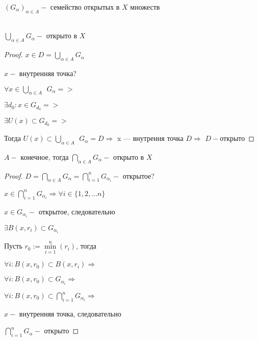     $(G_{\alpha})_{\alpha \in A}-$ семейство открытых в $X$ множеств\\\\
    \begin{theorem}
        $\bigcup\limits_{\alpha \in A} G_{\alpha}-$ открыто в $X$
    \end{theorem}
    \begin{proof}
        $x \in D = \bigcup\limits_{\alpha \in A} G_{\alpha}$
        
        $x - $ внутренняя точка?
        
        $\displaystyle \forall x \in \bigcup_{\alpha \in A} \ \ G_{\alpha} =>$
        
        $\exists d_{0} : x \in G_{d_{0}}=>$
        
        $\exists U(x) \subset G_{d_{0}}=>$
        
        Тогда $U(x) \subset \bigcup\limits_{\alpha \in A} \ \ G_{\alpha} = D \Rightarrow$ x --- внутрення точка $D \Rightarrow$ $D - $открыто
    \end{proof}
    \begin{theorem}
        $A - $ конечное, тогда $\bigcap\limits_{\alpha \in A} G_{\alpha}-$ открыто в $X$
    \end{theorem}
    \begin{proof}
        $D = \bigcap\limits_{\alpha \in A}G_{\alpha} = \bigcap\limits_{i = 1}^{n}G_{\alpha_i}-$ открытое?
        
        $x \in \bigcap\limits_{i = 1}^{n}G_{\alpha_i} \Rightarrow \forall i \in  \{1, 2, ... n\}$
        
        $x \in G_{\alpha_i}-$ открытое, следовательно
        
        $\exists B(x, r_{i}) \subset G_{\alpha_{i}}$
        
        Пусть $r_0 := \min\limits_{i = 1} ^ {n}(r_{i})$, тогда
        
        $\forall i : B(x, r_0) \subset  B(x, r_{i}) \Rightarrow$
        
        $\forall i : B(x, r_0) \subset  G_{\alpha_{i}} \Rightarrow$
        
        $\forall i : B(x, r_0) \subset  \bigcap\limits_{i = 1}^{n}G_{\alpha_i} \Rightarrow$
        
        $x-$ внутренняя точка, следовательно
        
        $\bigcap\limits_{i = 1}^{n}G_{\alpha}-$ открыто
    \end{proof}

